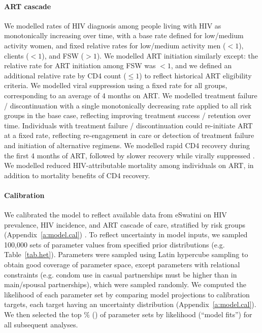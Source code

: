 \paragraph{ART cascade}
We modelled rates of HIV diagnosis among people living with HIV as monotonically increasing over time,
with a base rate defined for low/medium activity women,
and fixed relative rates for low/medium activity men ($<1$), clients ($<1$), and FSW ($>1$).
We modelled ART initiation similarly except:
the relative rate for ART initiation among FSW was $<1$, and
we defined an additional relative rate by CD4 count ($\le1$)
to reflect historical ART eligibility criteria. %
We modelled viral suppression using a fixed rate for all groups,
corresponding to an average of 4 months on ART. %
We modelled treatment failure / discontinuation with a single monotonically decreasing rate
applied to all risk groups in the base case,
reflecting improving treatment success / retention over time.
Individuals with treatment failure / discontinuation could re-initiate ART at a fixed rate,
reflecting re-engagement in care or detection of treatment failure and initiation of alternative regimens.
We modelled rapid CD4 recovery during the first 4 months of ART,
followed by slower recovery while virally suppressed \cite{Battegay2006,Lawn2006,Gabillard2013}.
We modelled reduced HIV-attributable mortality among individuals on ART,
in addition to mortality benefits of CD4 recovery.
\paragraph{Calibration}
We calibrated the model to reflect
available data from eSwatini on HIV prevalence, HIV incidence, and ART cascade of care,
stratified by risk groups (Appendix~\ref{a:model.cal}) \cite{SDHS2006,SHIMS1,SHIMS2,Baral2014,EswKP2014}.
To reflect uncertainty in model inputs,
we sampled 100,000 sets of parameter values from specified prior distributions %
(e.g. Table~\ref{tab.het}).
Parameters were sampled using Latin hypercube sampling \cite{McKay1979}
to obtain good coverage of parameter space,
except parameters with relational constraints
(e.g. condom use in casual partnerships must be higher than in main/spousal partnerships),
which were sampled randomly.
We computed the likelihood of each parameter set by
comparing model projections to calibration targets,
each target having an uncertainty distribution (Appendix~\ref{a:model.cal}).
We then selected the top \% () of parameter sets by likelihood (``model fits'')
for all subsequent analyses.
